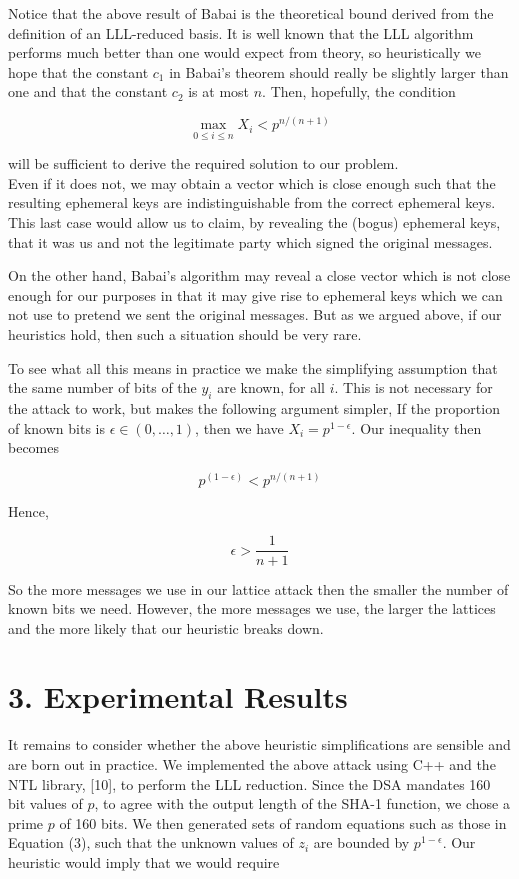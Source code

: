 \documentclass[10pt]{article}
\begin{document}
Notice that the above result of Babai is the theoretical bound derived from the definition of an LLL-reduced basis. It is well known that the LLL algorithm performs much better than one would expect from theory, so heuristically we hope that the constant $c_{1}$ in Babai's theorem should really be slightly larger than one and that the constant $c_{2}$ is at most $n$. Then, hopefully, the condition

$$
\max _{0 \leq i \leq n} X_{i}<p^{n /(n+1)}
$$

will be sufficient to derive the required solution to our problem.\\
Even if it does not, we may obtain a vector which is close enough such that the resulting ephemeral keys are indistinguishable from the correct ephemeral keys. This last case would allow us to claim, by revealing the (bogus) ephemeral keys, that it was us and not the legitimate party which signed the original messages.

On the other hand, Babai's algorithm may reveal a close vector which is not close enough for our purposes in that it may give rise to ephemeral keys which we can not use to pretend we sent the original messages. But as we argued above, if our heuristics hold, then such a situation should be very rare.

To see what all this means in practice we make the simplifying assumption that the same number of bits of the $y_{i}$ are known, for all $i$. This is not necessary for the attack to work, but makes the following argument simpler, If the proportion of known bits is $\epsilon \in(0, \ldots, 1)$, then we have $X_{i}=p^{1-\epsilon}$. Our inequality then becomes

$$
p^{(1-\epsilon)}<p^{n /(n+1)}
$$

Hence,

$$
\epsilon>\frac{1}{n+1}
$$

So the more messages we use in our lattice attack then the smaller the number of known bits we need. However, the more messages we use, the larger the lattices and the more likely that our heuristic breaks down.

\section*{3. Experimental Results}
It remains to consider whether the above heuristic simplifications are sensible and are born out in practice. We implemented the above attack using C++ and the NTL library, [10], to perform the LLL reduction. Since the DSA mandates 160 bit values of $p$, to agree with the output length of the SHA-1 function, we chose a prime $p$ of 160 bits. We then generated sets of random equations such as those in Equation (3), such that the unknown values of $z_{i}$ are bounded by $p^{1-\epsilon}$. Our heuristic would imply that we would require
\end{document}
